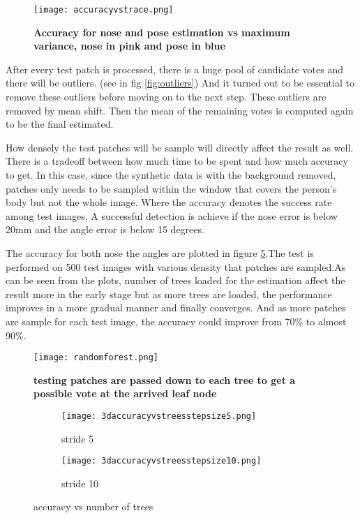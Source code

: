 \begin{figure}
	\centering
	\texttt{[image: accuracyvstrace.png]}
	\caption[Accuracy vs trace]{\label{fig:accuracyvstrace}}  \textbf{Accuracy for nose and pose estimation vs maximum variance, nose in pink and pose in blue} 
\end{figure}

 After every test patch is processed, there is a huge pool of candidate votes and there will be outliers. (see in fig \ref{fig:outliers}) And it turned out to be essential to remove these outliers before moving on to the next step. These outliers are removed by mean shift. \cite{GFRF} Then the mean of the remaining votes is computed again to be the final estimated.

How densely the test patches will be sample will directly affect the result as well. There is a tradeoff between how much time to be spent and how much accuracy to get.  In this case, since the synthetic data is with the background removed, patches only needs to be sampled within the window that covers the person's body but not the whole image. Where the accuracy denotes the success rate among test images. A successful detection is achieve if the nose error is below 20mm and the angle error is below 15 degrees. \cite{GFRF}


The accuracy for both nose the angles are plotted in figure \ref{fig:avt}.The test is performed on 500 test images with various density that patches are sampled.As can be seen from the plots, number of trees loaded for the estimation affect the result more in the early stage but as more trees are loaded, the performance improves in a more gradual manner and finally converges. And as more patches are sample for each test image, the accuracy could improve from 70\% to almost 90\%.


\begin{figure}
	\centering
	\texttt{[image: randomforest.png]}
	\caption[testing time forest]{\label{fig:rftest}}  \textbf{testing patches are passed down to each tree to get a possible vote at the arrived leaf node \cite{GFRF}} 
\end{figure}


\begin{figure}
        \centering
	 \begin{subfigure}[b]{0.5\textwidth}
                \texttt{[image: 3daccuracyvstreesstepsize5.png]}
                \caption{stride 5}
                \label{fig:naa5}
        \end{subfigure}%
        \begin{subfigure}[b]{0.5\textwidth}
                \texttt{[image: 3daccuracyvstreesstepsize10.png]}
                \caption{stride 10}
                \label{fig:naa10}
        \end{subfigure}%
        \caption{accuracy vs number of trees}\label{fig:avt}
\end{figure}


